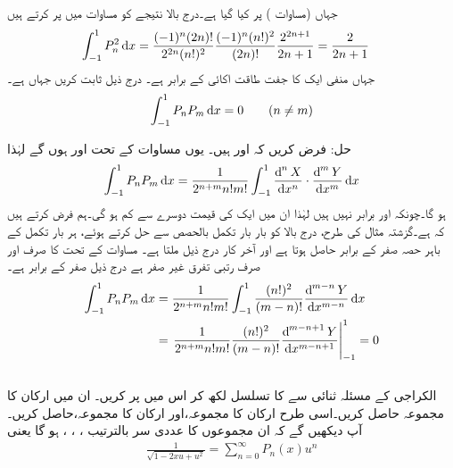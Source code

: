 جہاں   (مساوات ) پر کیا گیا ہے۔درج بالا نتیجے کو مساوات  میں پر کرتے ہیں
 \begin{align}\label{مساوات_طاقتی_لیژانڈر_معیار}
\int_{-1}^{1} P_n^2  \dif x&=\frac{(-1)^n (2n)!}{2^{2n}(n!)^2}\frac{(-1)^n(n!)^2}{(2n)!}\frac{2^{2n+1}}{2n+1}=\frac{2}{2n+1}
\end{align}
جہاں منفی ایک کا جفت طاقت اکائی کے برابر  ہے۔
درج ذیل ثابت کریں جہاں  ہے۔
\begin{align}
\int_{-1}^{1}P_nP_m \dif x=0\quad \quad (n \ne m)
\end{align}

حل: فرض کریں کہ  اور  ہیں۔ یوں مساوات  کے تحت
  اور    ہوں گے لہٰذا
\begin{align*}
\int_{-1}^{1}P_n P_m \dif x=\frac{1}{2^{n+m}n!m!}\int_{-1}^{1} \frac{\dif^{\,n}X}{\dif x^n}\cdot \frac{\dif^{\,m}Y}{\dif x^m}\dif x
\end{align*}
ہو گا۔چونکہ  اور  برابر نہیں ہیں لہٰذا ان میں ایک کی قیمت دوسرے سے کم ہو گی۔ہم فرض کرتے ہیں کہ  ہے۔گزشتہ مثال کی طرح، درج بالا کو بار بار تکمل بالحصص سے حل کرتے ہوئے، ہر بار تکمل کے باہر حصہ صفر کے برابر حاصل ہوتا ہے اور آخر کار درج ذیل ملتا ہے۔ مساوات  کے تحت  کا صرف اور صرف  رتبی تفرق غیر صفر ہے درج ذیل صفر کے برابر ہے۔
\begin{align*}
\int_{-1}^{1}P_nP_m\dif x&=\frac{1}{2^{n+m}n!m!}\int_{-1}^{1} \frac{(n!)^2}{(m-n)!}\frac{\dif^{\,m-n}Y}{\dif x^{m-n}}\dif x\\
&=\left. \frac{1}{2^{n+m}n!m!} \frac{(n!)^2}{(m-n)!}\frac{\dif^{\,m-n+1}Y}{\dif x^{m-n+1}}\right|_{-1}^{1}=0
\end{align*}
\quad {}\\
الکراجی کے مسئلہ ثنائی سے  کا تسلسل لکھ کر اس میں  پر کریں۔ ان میں  ارکان کا مجموعہ حاصل کریں۔اسی طرح   ارکان کا مجموعہ،اور  ارکان کا مجموعہ،  حاصل کریں۔آپ دیکھیں گے کہ ان مجموعوں کا عددی سر بالترتیب ، ، ،  ہو گا یعنی
\begin{align}\label{مساوات_بیسل_پیداکار_تفاعل_لیژانڈر}
\frac{1}{\sqrt{1-2xu+u^2}}=\sum_{n=0}^{\infty}P_n(x)u^n
\end{align}

